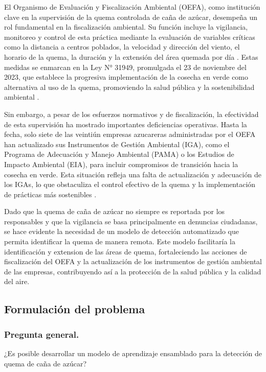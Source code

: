 El Organismo de Evaluación y Fiscalización Ambiental (OEFA), como institución clave en la supervisión de la quema controlada de caña de azúcar, desempeña un rol fundamental en la fiscalización ambiental. Su función incluye la vigilancia, monitoreo y control de esta práctica mediante la 
evaluación de variables críticas como la distancia a centros poblados, la velocidad y dirección del viento, el horario de la quema, la duración y la extensión del área quemada por día \citep{oefa_canazucar_2023}. Estas medidas se enmarcan en la Ley N° 31949, promulgada el 23 de noviembre del 2023,
que establece la progresiva implementación de la cosecha en verde como alternativa al uso de la quema, promoviendo la salud pública y la sostenibilidad ambiental \citep{agrolmos_sa_modificacion_2021,agroaurora_sac_actualizacion_2020}.

Sin embargo, a pesar de los esfuerzos normativos y de fiscalización, la efectividad de esta supervisión ha mostrado importantes deficiencias operativas. Hasta la fecha, solo siete de las veintiún empresas azucareras administradas por el OEFA han actualizado sus Instrumentos de Gestión Ambiental (IGA), 
como el Programa de Adecuación y Manejo Ambiental (PAMA) o los Estudios de Impacto Ambiental (EIA), para incluir compromisos de transición hacia la cosecha en verde. Esta situación refleja una falta de actualización y adecuación de los IGAs, lo que obstaculiza el control 
efectivo de la quema y la implementación de prácticas más sostenibles \citep[pp. 1530 - 1536]{casa_grande_saa_2018}.

Dado que la quema de caña de azúcar no siempre es reportada por los responsables y que la vigilancia se basa principalmente en denuncias ciudadanas, se hace evidente la necesidad de un modelo de detección automatizado que permita identificar la quema de manera remota. Este modelo facilitaría 
la identificación y extension de las áreas de quema, fortaleciendo las acciones de fiscalización del OEFA y la actualización de los instrumentos de gestión ambiental de las empresas, contribuyendo así a la protección de la salud pública y la calidad del aire.

\subsection{Formulación del problema}
\subsubsection{Pregunta general.}
¿Es posible desarrollar un modelo de aprendizaje ensamblado para la detección de quema de caña de azúcar?
